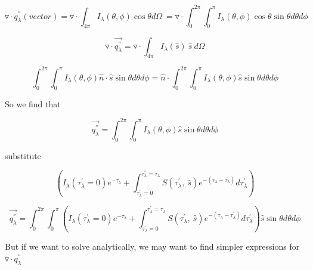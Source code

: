 \documentclass[12pt]{article}
\renewcommand{\_}{\kern-1.5pt\textunderscore\kern-1.5pt}
\begin{document}
\vspace{\baselineskip}
 \[ \triangledown  \cdot q_{ \lambda }^{''} \left( vector \right) =\triangledown  \cdot  \int _{4 \pi }^{}I_{ \lambda } \left(  \theta , \phi  \right) \cos  \theta d \Omega ~=\triangledown  \cdot  \int _{0}^{2 \pi } \int _{0}^{ \pi }I_{ \lambda } \left(  \theta , \phi  \right) \cos  \theta \sin  \theta  d \theta d \phi  \] \par

 \[ \triangledown  \cdot \overrightarrow{q_{ \lambda }^{''}}=\triangledown  \cdot  \int _{4 \pi }^{}I_{ \lambda } \left( \hat{s} \right) ~\hat{s}~d \Omega  \] \par

 \[  \int _{0}^{2 \pi } \int _{0}^{ \pi }I_{ \lambda } \left(  \theta , \phi  \right) \hat{n} \cdot \hat{s}\sin  \theta  d \theta d \phi =\hat{n} \cdot  \int _{0}^{2 \pi } \int _{0}^{ \pi }I_{ \lambda } \left(  \theta , \phi  \right) \hat{s}\sin  \theta  d \theta d \phi  \] \par

So we find that\par

 \[ \overrightarrow{q_{ \lambda }^{''}}= \int _{0}^{2 \pi } \int _{0}^{ \pi }I_{ \lambda } \left(  \theta , \phi  \right) \hat{s}\sin  \theta  d \theta d \phi  \] \par

substitute\par

 \[  \left( I_{ \lambda } \left(  \tau_{ \lambda }^{'}=0 \right) e^{- \tau_{ \lambda }}+ \int _{ \tau_{ \lambda }^{'}=0}^{ \tau_{ \lambda }^{'}= \tau_{ \lambda }}S \left(  \tau_{ \lambda }^{'},~\hat{s} \right) e^{- \left(  \tau_{ \lambda }- \tau_{ \lambda }^{'} \right) }d \tau_{ \lambda }^{'} \right)  \] \par

 \[ \overrightarrow{q_{ \lambda }^{''}}= \int _{0}^{2 \pi } \int _{0}^{ \pi } \left( I_{ \lambda } \left(  \tau_{ \lambda }^{'}=0 \right) e^{- \tau_{ \lambda }}+ \int _{ \tau_{ \lambda }^{'}=0}^{ \tau_{ \lambda }^{'}= \tau_{ \lambda }}S \left(  \tau_{ \lambda }^{'},~\hat{s} \right) e^{- \left(  \tau_{ \lambda }- \tau_{ \lambda }^{'} \right) }d \tau_{ \lambda }^{'} \right) \hat{s}\sin  \theta  d \theta d \phi  \] \par


\vspace{\baselineskip}
But if we want to solve analytically, we may want to find simpler expressions for  \( \triangledown  \cdot q_{ \lambda }^{''} \) \par
\end{document}
